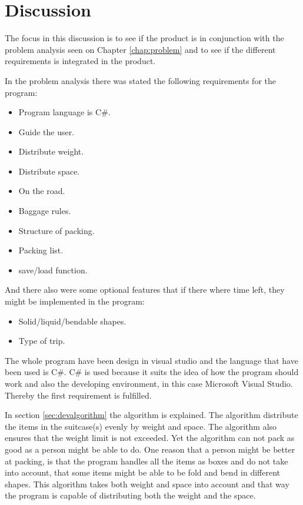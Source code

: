 \section{Discussion}
The focus in this discussion is to see if the product is in conjunction with the problem analysis seen on Chapter \ref{chap:problem} and to see if the different requirements  is integrated in the product.

In the problem analysis there was stated the following requirements for the program:

\begin{itemize}
\item Program language is C\#.
\item Guide the user.
\item Distribute weight.
\item Distribute space.
\item On the road.
\item Baggage rules.
\item Structure of packing.
\item Packing list.
\item save/load function.
\end{itemize}

And there also were some optional features that if there where time left, they might be implemented in the program:
\begin{itemize}
\item Solid/liquid/bendable shapes.
\item Type of trip.
\end{itemize}

The whole program have been design in visual studio and the language that have been used is C\#. C\# is used because it suits the idea of how the program should work and also the developing environment, in this case Microsoft Visual Studio. Thereby the first requirement is fulfilled.

In section \ref{sec:devalgorithm} the algorithm is explained. The algorithm distribute the items in the suitcase(s) evenly by weight and space. The algorithm also ensures that the weight limit is not exceeded. Yet the algorithm can not pack as good as a person might be able to do. One reason that a person might be better at packing, is that the program handles all the items as boxes and do not take into account, that some items might be able to be fold and bend in different shapes. This algorithm takes both weight and space into account and that way the program is capable of distributing both the weight and the space.

